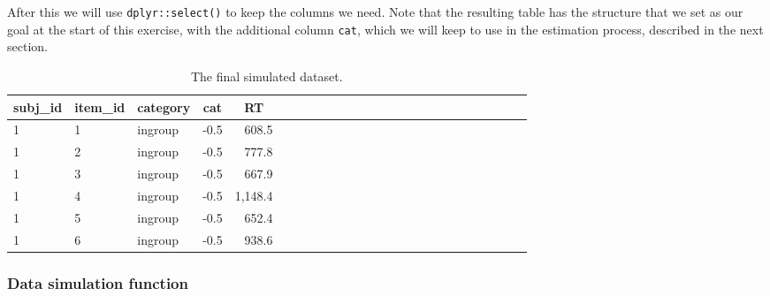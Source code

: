 \documentclass[doc,floatsintext]{apa6}
\newenvironment{Shaded}{\begin{snugshade}}{\end{snugshade}}
\newcommand{\KeywordTok}[1]{\textcolor[rgb]{0.13,0.29,0.53}{\textbf{#1}}}
\newcommand{\DataTypeTok}[1]{\textcolor[rgb]{0.13,0.29,0.53}{#1}}
\newcommand{\StringTok}[1]{\textcolor[rgb]{0.31,0.60,0.02}{#1}}
\newcommand{\CommentTok}[1]{\textcolor[rgb]{0.56,0.35,0.01}{\textit{#1}}}
\newcommand{\OperatorTok}[1]{\textcolor[rgb]{0.81,0.36,0.00}{\textbf{#1}}}
\newcommand{\NormalTok}[1]{#1}
\begin{document}
After this we will use \texttt{dplyr::select()} to keep the columns we
need. Note that the resulting table has the structure that we set as our
goal at the start of this exercise, with the additional column
\texttt{cat}, which we will keep to use in the estimation process,
described in the next section.

\begin{Shaded}
\end{Shaded}

\begin{table}[H]
\begin{center}
\begin{threeparttable}
\caption{\label{tab:dat-sim-table}The final simulated dataset.}
\begin{tabular}{lllrrlllrrlllrrlllrrlllrr}
\toprule
subj\_id & \multicolumn{1}{c}{item\_id} & \multicolumn{1}{c}{category} & \multicolumn{1}{c}{cat} & \multicolumn{1}{c}{RT}\\
\midrule
1 & 1 & ingroup & -0.5 & 608.5\\
1 & 2 & ingroup & -0.5 & 777.8\\
1 & 3 & ingroup & -0.5 & 667.9\\
1 & 4 & ingroup & -0.5 & 1,148.4\\
1 & 5 & ingroup & -0.5 & 652.4\\
1 & 6 & ingroup & -0.5 & 938.6\\
\bottomrule
\end{tabular}
\end{threeparttable}
\end{center}
\end{table}

\subsubsection{Data simulation function}\label{data-simulation-function}
\end{document}
